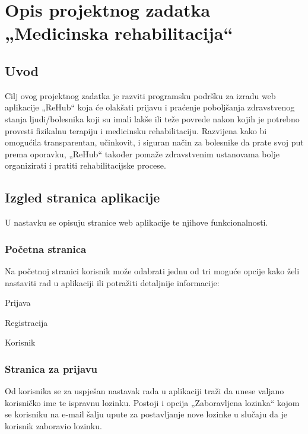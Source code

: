 \chapter{Opis projektnog zadatka „Medicinska rehabilitacija“}
		
		
		
		\section{Uvod}
		
		Cilj ovog projektnog zadatka je razviti programsku podršku za izradu web aplikacije „ReHub“ koja će olakšati prijavu i praćenje poboljšanja zdravstvenog stanja ljudi/bolesnika koji su imali lakše ili teže povrede nakon kojih je potrebno provesti fizikalnu terapiju i medicinsku rehabilitaciju. Razvijena kako bi omogućila transparentan, učinkovit, i siguran način za bolesnike da prate svoj put prema oporavku, „ReHub“ također pomaže zdravstvenim ustanovama bolje organizirati i pratiti rehabilitacijske procese.

        \section{Izgled stranica aplikacije}

        U nastavku se opisuju stranice web aplikacije te njihove funkcionalnosti.

        \subsection{Početna stranica}

        Na početnoj stranici korisnik može odabrati jednu od tri moguće opcije kako želi nastaviti rad u aplikaciji ili potražiti detaljnije informacije:

        \begin{packed_item}
			
			\item  Prijava
			\item  Registracija
			\item  Korisnik

        \end{packed_item}

        \subsection{Stranica za prijavu}

        Od korisnika se za uspješan nastavak rada u aplikaciji traži da unese valjano korisničko ime te ispravnu lozinku. Postoji i opcija „Zaboravljena lozinka“ kojom se korisniku na e-mail šalju upute za postavljanje nove lozinke u slučaju da je korisnik zaboravio lozinku.


